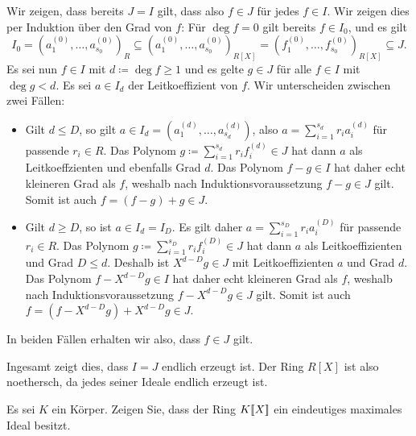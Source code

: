\begin{solution}
  Wir zeigen, dass bereits $J = I$ gilt, dass also $f \in J$ für jedes $f \in I$.
  Wir zeigen dies per Induktion über den Grad von $f$:
  Für $\deg f = 0$ gilt bereits $f\in I_0$, und es gilt
  \[
              I_0
    =         (a^{(0)}_1, \dotsc, a^{(0)}_{s_0})_R
    \subseteq (a^{(0)}_1, \dotsc, a^{(0)}_{s_0})_{R[X]}
    =         (f^{(0)}_1, \dotsc, f^{(0)}_{s_0})_{R[X]}
    \subseteq J.
  \]
  Es sei nun $f \in I$ mit $d \coloneqq \deg f \geq 1$ und es gelte $g \in J$ für alle $f \in I$ mit $\deg g < d$.
  Es sei $a \in I_d$ der Leitkoeffizient von $f$.
  Wir unterscheiden zwischen zwei Fällen:
  \begin{itemize}
    \item
      Gilt $d \leq D$, so gilt $a \in I_d = (a^{(d)}_1, \dotsc, a^{(d)}_{s_d})$, also $a = \sum_{i=1}^{s_d} r_i a^{(d)}_i$ für passende $r_i \in R$.
      Das Polynom $g \coloneqq \sum_{i=1}^{s_d} r_i f^{(d)}_i \in J$ hat dann $a$ als Leitkoeffzienten und ebenfalls Grad $d$.
      Das Polynom $f - g \in I$ hat daher echt kleineren Grad als $f$, weshalb nach Induktionsvoraussetzung $f - g \in J$ gilt.
      Somit ist auch $f = (f - g) + g \in J$.
    \item
      Gilt $d \geq D$, so ist $a \in I_d = I_D$.
      Es gilt daher $a = \sum_{i=1}^{s_D} r_i a^{(D)}_i$ für passende $r_i \in R$.
      Das Polynom $g \coloneqq \sum_{i=1}^{s_D} r_i f^{(D)}_i \in J$ hat dann $a$ als Leitkoeffizienten und Grad $D \leq d$.
      Deshalb ist $X^{d-D} g \in J$ mit Leitkoeffizienten $a$ und Grad $d$.
      Das Polynom $f - X^{d-D} g \in I$ hat daher echt kleineren Grad als $f$, weshalb nach Induktionsvoraussetzung $f - X^{d-D} g \in J$ gilt.
      Somit ist auch $f = (f - X^{d-D} g) + X^{d-D} g \in J$.
  \end{itemize}
  In beiden Fällen erhalten wir also, dass $f \in J$ gilt.
  
  Ingesamt zeigt dies, dass $I = J$ endlich erzeugt ist.
  Der Ring $R[X]$ ist also noethersch, da jedes seiner Ideale endlich erzeugt ist.
\end{solution}


\begin{question}[subtitle = $\powerseries{K}{X}$ ist lokal]
  Es sei $K$ ein Körper.
  Zeigen Sie, dass der Ring $\powerseries{K}{X}$ ein eindeutiges maximales Ideal besitzt.
\end{question}


